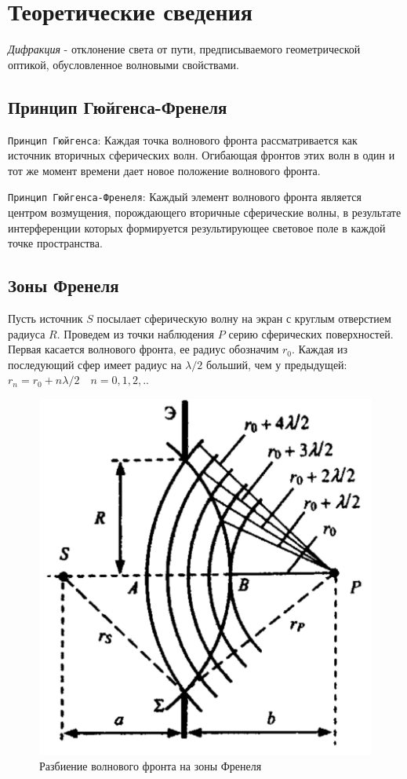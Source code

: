\documentclass[a4paper,12pt]{article}
\begin{document}
\section{Теоретические сведения}

\textit{Дифракция} - отклонение света от пути, предписываемого геометрической оптикой, обусловленное волновыми свойствами.

\subsection{Принцип Гюйгенса-Френеля}

\texttt{Принцип Гюйгенса}: Каждая точка волнового фронта рассматривается как источник вторичных сферических волн. Огибающая фронтов этих волн в один и тот же момент времени дает новое положение волнового фронта.

\texttt{Принцип Гюйгенса-Френеля}: Каждый элемент волнового фронта является центром возмущения, порождающего вторичные сферические волны, в результате интерференции которых формируется результирующее световое поле в каждой точке пространства.

\subsection{Зоны Френеля}

Пусть источник $S$ посылает сферическую волну на экран с круглым отверстием радиуса $R$. Проведем из точки наблюдения $P$ серию сферических поверхностей. Первая касается волнового фронта, ее радиус обозначим $r_0$. Каждая из последующий сфер имеет радиус на $\lambda/2$ больший, чем у предыдущей: $r_n = r_0 + n\lambda/2 \quad n=0,1,2,..$

\begin{figure}[h]
\centering
\includegraphics[width=0.4\linewidth]{img6.png}
\caption{Разбиение волнового фронта на зоны Френеля}
\label{img6}
\end{figure}
\end{document}
